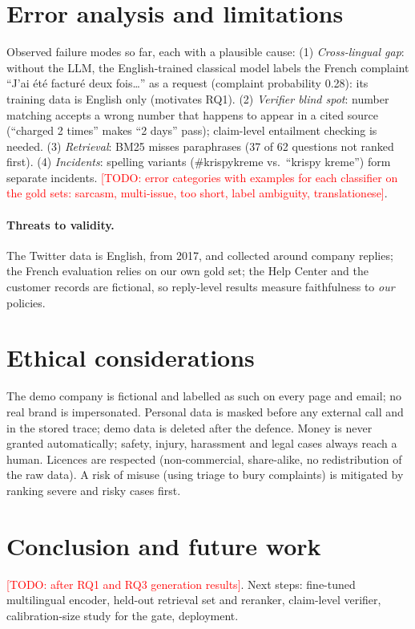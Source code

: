 \documentclass[11pt,a4paper]{article}
\newcommand{\todo}[1]{\textcolor{red}{[TODO: #1]}}
\begin{document}
\section{Error analysis and limitations}
Observed failure modes so far, each with a plausible cause:
(1) \emph{Cross-lingual gap}: without the LLM, the English-trained classical model labels the French
complaint ``J'ai été facturé deux fois\dots'' as a request (complaint probability 0.28): its training
data is English only (motivates RQ1).
(2) \emph{Verifier blind spot}: number matching accepts a wrong number that happens to appear in a
cited source (``charged 2 times'' makes ``2 days'' pass); claim-level entailment checking is needed.
(3) \emph{Retrieval}: BM25 misses paraphrases (37 of 62 questions not ranked first).
(4) \emph{Incidents}: spelling variants (\#krispykreme vs.\ ``krispy kreme'') form separate incidents.
\todo{error categories with examples for each classifier on the gold sets: sarcasm, multi-issue,
too short, label ambiguity, translationese}.

\paragraph{Threats to validity.} The Twitter data is English, from 2017, and collected around company
replies; the French evaluation relies on our own gold set; the Help Center and the customer records
are fictional, so reply-level results measure faithfulness to \emph{our} policies.

\section{Ethical considerations}
The demo company is fictional and labelled as such on every page and email; no real brand is
impersonated. Personal data is masked before any external call and in the stored trace; demo data is
deleted after the defence. Money is never granted automatically; safety, injury, harassment and
legal cases always reach a human. Licences are respected (non-commercial, share-alike, no
redistribution of the raw data). A risk of misuse (using triage to bury complaints) is mitigated by
ranking severe and risky cases first.

\section{Conclusion and future work}
\todo{after RQ1 and RQ3 generation results}. Next steps: fine-tuned multilingual encoder, held-out
retrieval set and reranker, claim-level verifier, calibration-size study for the gate, deployment.
\end{document}
